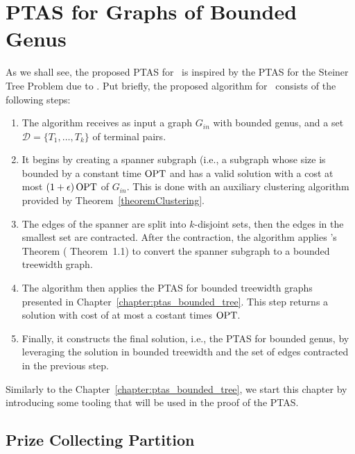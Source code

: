 \chapter{PTAS for Graphs of Bounded Genus}
\label{chapter:ptas_bounded_genus}

As we shall see, the proposed PTAS for \steinercycle\ is inspired by the PTAS for the Steiner Tree Problem due to \cite{Bateni}. Put briefly, the proposed algorithm for \steinercycle\ consists of the following steps:

\begin{enumerate}
    \item The algorithm receives as input a graph \(G_{in}\) with bounded genus, and a set \(\mathcal{D} = \{T_1, \dots, T_k\}\) of terminal pairs.

    \item It begins by creating a spanner subgraph (i.e., a subgraph whose size is bounded by a constant time \(\operatorname{\textrm{OPT}}\) and has a valid solution with a cost at most \((1 + \epsilon) \operatorname{\textrm{OPT}}\) of \(G_{in}\). This is done with an auxiliary clustering algorithm provided by Theorem~\ref{theoremClustering}.

    \item The edges of the spanner are split into \(k\)-disjoint sets, then the edges in the smallest set are contracted. After the contraction, the algorithm applies \citeauthor{Demaine2010}'s Theorem (\cite{Demaine2010} Theorem~1.1) to convert the spanner subgraph to a bounded treewidth graph.

    \item The algorithm then applies the PTAS for bounded treewidth graphs presented in Chapter~\ref{chapter:ptas_bounded_tree}. This step returns a solution with cost of at most a costant times \(\operatorname{\textrm{OPT}}\).

    \item Finally, it constructs the final solution, i.e., the PTAS for bounded genus, by leveraging the solution in bounded treewidth and the set of edges contracted in the previous step.
\end{enumerate}

Similarly to the Chapter~\ref{chapter:ptas_bounded_tree}, we start this chapter by introducing some tooling that will be used in the proof of the PTAS.

\section{Prize Collecting Partition}
\label{section:pc-partition}

